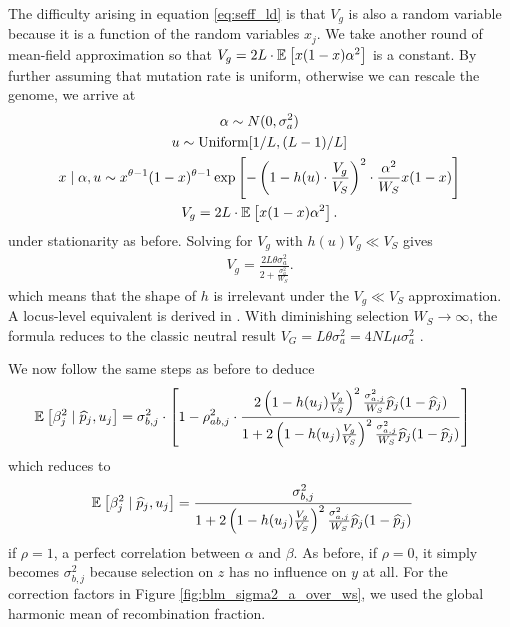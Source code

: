 \documentclass[10pt]{article}
\begin{document}
The difficulty arising in equation \eqref{eq:seff_ld} is that $V_g$ is also a random variable because it is a function of the random variables $x_j$.
We take another round of mean-field approximation so that $V_g = 2L \cdot \mathbb{E}_{}\left[x(1-x)\alpha^2\right]$ is a constant.
By further assuming that mutation rate is uniform, otherwise we can rescale the genome,
we arrive at
\begin{gather}
    \begin{gathered}
        \alpha \sim N(0, \sigma_a^2) \\
        u \sim \mathrm{Uniform}[1/L,(L-1)/L] \\
        x \mid \alpha, u \sim x^{\theta-1}(1-x)^{\theta-1}
        \exp\left[
            - \left(
            1- h(u) \cdot \frac{V_g}{V_S}
            \right)^2 \cdot 
            \frac{\alpha^2}{W_S}
            x(1-x)
        \right] \\
        V_g = 2L \cdot \mathbb{E}_{}\left[x(1-x)\alpha^2\right].
    \end{gathered}
\end{gather}
under stationarity as before.
Solving for $V_g$ with $h(u) V_g \ll V_S$ gives
\begin{align}
    V_g = \frac{2L\theta \sigma_a^2}{2 + \frac{\sigma_a^2}{W_S}}.
\end{align}
which means that the shape of $h$ is irrelevant under the $V_g \ll V_S$ approximation.
A locus-level equivalent is derived in \citet{Keightley_1988}.
With diminishing selection $W_S \rightarrow \infty$, the formula reduces to the classic neutral result $V_G = L\theta\sigma_a^2 = 4NL\mu\sigma_a^2$ \citep{Lynch_1986}.

We now follow the same steps as before to deduce
\begin{align} \label{eq:arch_final}
    \begin{aligned}
        \mathbb{E}_{}\left[\beta_j^2 \mid \widehat{p}_j, u_j\right]
    &= \sigma_{b,j}^2 \cdot 
    \left[
    1 - 
    \rho_{ab,j}^2 \cdot 
        \frac{
             2\left(1-h(u_j)\frac{V_g}{V_S}\right)^2\frac{\sigma_{a,j}^2}{W_S} \widehat{p}_j(1-\widehat{p}_j)}{
            1 + 2\left(1-h(u_j)\frac{V_g}{V_S}\right)^2\frac{\sigma_{a,j}^2}{W_S} \widehat{p}_j(1-\widehat{p}_j) 
        }
    \right]
    \end{aligned}
\end{align}
which reduces to
\begin{align}
    \begin{aligned}
        \mathbb{E}_{}\left[\beta_j^2 \mid \widehat{p}_j, u_j\right]
    &=   
        \frac{
        \sigma_{b,j}^2
             }{
            1 + 2\left(1-h(u_j)\frac{V_g}{V_S}\right)^2\frac{\sigma_{a,j}^2}{W_S} \widehat{p}_j(1-\widehat{p}_j) 
        }
    \end{aligned}
\end{align}
if $\rho=1$, a perfect correlation between $\alpha$ and $\beta$.
As before, if $\rho=0$, it simply becomes $\sigma_{b,j}^2$ because selection on $z$ has no influence on $y$ at all.
For the correction factors in Figure \ref{fig:blm_sigma2_a_over_ws}, we used the global harmonic mean of recombination fraction.
\end{document}
